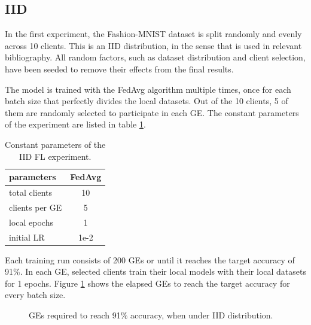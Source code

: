 \subsection{IID} %
In the first experiment, the Fashion-MNIST dataset is split randomly and evenly across 10 clients. This is an IID distribution, in the sense that is used in relevant bibliography. All random factors, such as dataset distribution and client selection, have been seeded to remove their effects from the final results. %

The model is trained with the FedAvg algorithm multiple times, once for each batch size that perfectly divides the local datasets. Out of the 10 clients, 5 of them are randomly selected to participate in each GE. The constant parameters of the experiment are listed in table \ref{table: ΙID experiment parameters}. %
\begin{table}[H]
    \center
    \begin{tabular}
        { | l | c | }
        \hline
        parameters & FedAvg\\\hline
        total clients   & 10\\\hline
        clients per GE  & 5\\\hline
        local epochs    & 1\\\hline
        initial LR      & 1e-2\\\hline
    \end{tabular}
    \caption[IID experiment parameters]{Constant parameters of the IID FL experiment.}
    \label{table: ΙID experiment parameters}
\end{table}

Each training run consists of 200 GEs or until it reaches the target accuracy of 91\%. In each GE, selected clients train their local models with their local datasets for 1 epochs. Figure \ref{fig: IID, GEs per batch size} shows the elapsed GEs to reach the target accuracy for every batch size.
\begin{figure}[H]
    \center
    \caption[ IID distribution, GEs per batch size ]{ GEs required to reach 91\% accuracy, when under IID distribution.}
    \label{fig: IID, GEs per batch size}
\end{figure}


